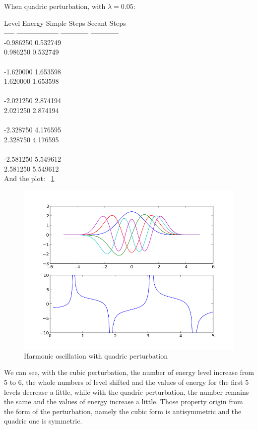 \documentclass[11pt,letterpaper]{article}
\begin{document}
When quadric perturbation, with $\lambda=0.05$:

 Level       Energy           Simple Steps   Secant Steps\\
 -----   ------------------   ------------   ------------\\
   -0.986250     0.532749\\
    0.986250     0.532749\\
\\
   -1.620000     1.653598\\
    1.620000     1.653598\\
\\
   -2.021250     2.874194\\
    2.021250     2.874194\\
\\
   -2.328750     4.176595\\
    2.328750     4.176595\\
\\
   -2.581250     5.549612\\
    2.581250     5.549612\\

And the plot: ~\ref{figure6}

\begin{figure}
\begin{center}
\includegraphics[width=0.8\linewidth,angle=0]{p2x4.png}
\caption{Harmonic oscillation with quadric perturbation}
\label{figure6}
\end{center}
\end{figure}
\newpage

We can see, with the cubic perturbation, the number of energy level increase from 5 to 6, the whole numbers of level shifted and the values of energy for the first 5 levels decrease a little, while with the quadric perturbation, the number remains the same and the values of energy increase a little. Those property origin from the form of the perturbation, namely the cubic form is antisymmetric and the quadric one is symmetric.
\end{document}
